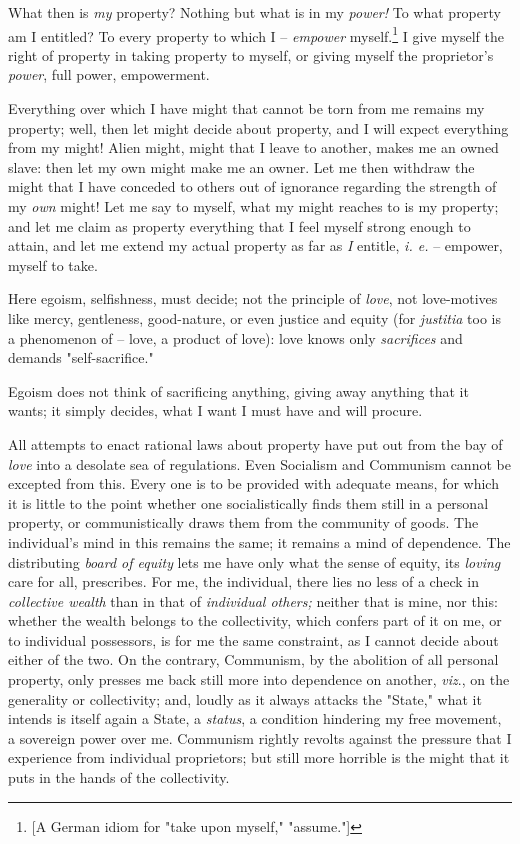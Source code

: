 \documentclass[a4paper]{book}
\begin{document}
What then is \textit{my} property? Nothing but what is in my \textit{power!} 
To what property am I entitled? To every property to which I -- 
\textit{empower} myself.\footnote{[A German idiom for "{}take upon myself,"{} 
"{}assume."{}]} I give myself the right of property in taking property to 
myself, or giving myself the proprietor's \textit{power}, full power, 
empowerment.

Everything over which I have might that cannot be torn from me remains my 
property; well, then let might decide about property, and I will expect 
everything from my might! Alien might, might that I leave to another, makes me 
an owned slave: then let my own might make me an owner. Let me then withdraw 
the might that I have conceded to others out of ignorance regarding the 
strength of my \textit{own} might! Let me say to myself, what my might reaches 
to is my property; and let me claim as property everything that I feel myself 
strong enough to attain, and let me extend my actual property as far as 
\textit{I} entitle, \textit{i. e.} -- empower, myself to take.

Here egoism, selfishness, must decide; not the principle of \textit{love}, not 
love-motives like mercy, gentleness, good-nature, or even justice and equity 
(for \textit{justitia} too is a phenomenon of -- love, a product of love): 
love knows only \textit{sacrifices} and demands "{}self-sacrifice."{}

Egoism does not think of sacrificing anything, giving away anything that it 
wants; it simply decides, what I want I must have and will procure.

All attempts to enact rational laws about property have put out from the bay 
of \textit{love} into a desolate sea of regulations. Even Socialism and 
Communism cannot be excepted from this. Every one is to be provided with 
adequate means, for which it is little to the point whether one 
socialistically finds them still in a personal property, or communistically 
draws them from the community of goods. The individual's mind in this remains 
the same; it remains a mind of dependence. The distributing \textit{board of 
equity} lets me have only what the sense of equity, its \textit{loving} care 
for all, prescribes. For me, the individual, there lies no less of a check in 
\textit{collective wealth} than in that of \textit{individual others;} neither 
that is mine, nor this: whether the wealth belongs to the collectivity, which 
confers part of it on me, or to individual possessors, is for me the same 
constraint, as I cannot decide about either of the two. On the contrary, 
Communism, by the abolition of all personal property, only presses me back 
still more into dependence on another, \textit{viz}., on the generality or 
collectivity; and, loudly as it always attacks the "{}State,"{} what it 
intends is itself again a State, a \textit{status}, a condition hindering my 
free movement, a sovereign power over me. Communism rightly revolts against 
the pressure that I experience from individual proprietors; but still more 
horrible is the might that it puts in the hands of the collectivity.
\end{document}
